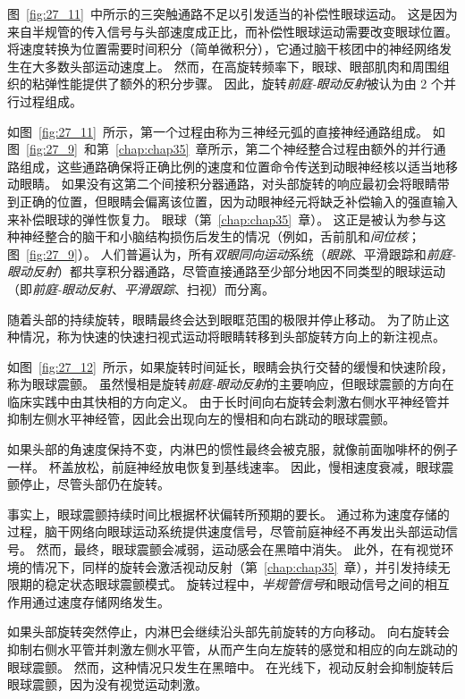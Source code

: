 图~\ref{fig:27_11}~中所示的三突触通路不足以引发适当的补偿性眼球运动。
这是因为来自半规管的传入信号与头部速度成正比，而补偿性眼球运动需要改变眼球位置。
将速度转换为位置需要时间积分（简单微积分），它通过脑干核团中的神经网络发生在大多数头部运动速度上。
然而，在高旋转频率下，眼球、眼部肌肉和周围组织的粘弹性能提供了额外的积分步骤。
因此，旋转\textit{前庭-眼动反射}被认为由 2 个并行过程组成。


如图~\ref{fig:27_11}~所示，第一个过程由称为三神经元弧的直接神经通路组成。
如图~\ref{fig:27_9}~和第~\ref{chap:chap35}~章所示，第二个神经整合过程由额外的并行通路组成，这些通路确保将正确比例的速度和位置命令传送到动眼神经核以适当地移动眼睛。
如果没有这第二个间接积分器通路，对头部旋转的响应最初会将眼睛带到正确的位置，但眼睛会偏离该位置，因为动眼神经元将缺乏补偿输入的强直输入来补偿眼球的弹性恢复力。
眼球（第~\ref{chap:chap35}~章）。
这正是被认为参与这种神经整合的脑干和小脑结构损伤后发生的情况（例如，舌前肌和\textit{间位核}；图~\ref{fig:27_9}）。
人们普遍认为，所有\textit{双眼同向运动}系统（\textit{眼跳}、平滑跟踪和\textit{前庭-眼动反射}）都共享积分器通路，尽管直接通路至少部分地因不同类型的眼球运动（即\textit{前庭-眼动反射}、\textit{平滑跟踪}、扫视）而分离。


随着头部的持续旋转，眼睛最终会达到眼眶范围的极限并停止移动。
为了防止这种情况，称为快速的快速扫视式运动将眼睛转移到头部旋转方向上的新注视点。


如图~\ref{fig:27_12}~所示，如果旋转时间延长，眼睛会执行交替的缓慢和快速阶段，称为眼球震颤。
虽然慢相是旋转\textit{前庭-眼动反射}的主要响应，但眼球震颤的方向在临床实践中由其快相的方向定义。
由于长时间向右旋转会刺激右侧水平神经管并抑制左侧水平神经管，因此会出现向左的慢相和向右跳动的眼球震颤。


如果头部的角速度保持不变，内淋巴的惯性最终会被克服，就像前面咖啡杯的例子一样。
杯盖放松，前庭神经放电恢复到基线速率。
因此，慢相速度衰减，眼球震颤停止，尽管头部仍在旋转。


事实上，眼球震颤持续时间比根据杯状偏转所预期的要长。
通过称为速度存储的过程，脑干网络向眼球运动系统提供速度信号，尽管前庭神经不再发出头部运动信号。
然而，最终，眼球震颤会减弱，运动感会在黑暗中消失。
此外，在有视觉环境的情况下，同样的旋转会激活视动反射（第~\ref{chap:chap35}~章），并引发持续无限期的稳定状态眼球震颤模式。
旋转过程中，\textit{半规管信号}和眼动信号之间的相互作用通过速度存储网络发生。


如果头部旋转突然停止，内淋巴会继续沿头部先前旋转的方向移动。
向右旋转会抑制右侧水平管并刺激左侧水平管，从而产生向左旋转的感觉和相应的向左跳动的眼球震颤。
然而，这种情况只发生在黑暗中。
在光线下，视动反射会抑制旋转后眼球震颤，因为没有视觉运动刺激。


